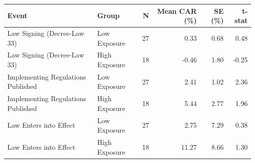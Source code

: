 \begin{tabular}{llrrrr}
  \toprule
Event & Group & N & Mean CAR (\%) & SE (\%) & t-stat \\
  \midrule
Law Signing (Decree-Law 33) & Low Exposure &  27 & 0.33 & 0.68 & 0.48 \\ 
  Law Signing (Decree-Law 33) & High Exposure &  18 & -0.46 & 1.80 & -0.25 \\ 
  Implementing Regulations Published & Low Exposure &  27 & 2.41 & 1.02 & 2.36 \\ 
  Implementing Regulations Published & High Exposure &  18 & 5.44 & 2.77 & 1.96 \\ 
  Law Enters into Effect & Low Exposure &  27 & 2.75 & 7.29 & 0.38 \\ 
  Law Enters into Effect & High Exposure &  18 & 11.27 & 8.66 & 1.30 \\ 
   \bottomrule
\end{tabular}

